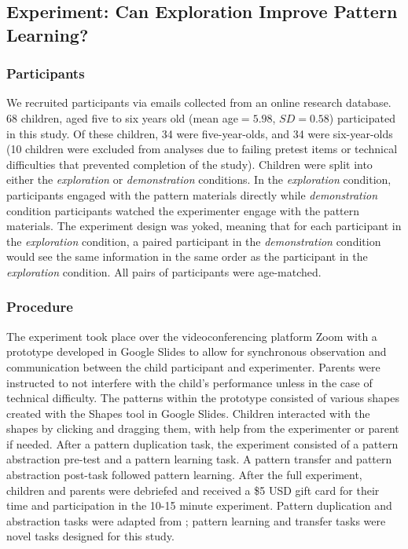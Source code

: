\subsection{Experiment: Can Exploration Improve Pattern Learning?}

\subsubsection{Participants}
We recruited participants via emails collected from an online research database. 68 children, aged five to six years old (mean age$=5.98$, $SD=0.58$) participated in this study. Of these children, 34 were five-year-olds, and 34 were six-year-olds (10 children were excluded from analyses due to failing pretest items or technical difficulties that prevented completion of the study). Children were split into either the \textit{exploration} or \textit{demonstration} conditions. In the \textit{exploration} condition, participants engaged with the pattern materials directly while \textit{demonstration} condition participants watched the experimenter engage with the pattern materials. The experiment design was yoked, meaning that for each participant in the \textit{exploration} condition, a paired participant in the \textit{demonstration} condition would see the same information in the same order as the participant in the \textit{exploration} condition. All pairs of participants were age-matched.

\subsubsection{Procedure}
The experiment took place over the videoconferencing platform Zoom with a prototype developed in Google Slides to allow for synchronous observation and communication between the child participant and experimenter. Parents were instructed to not interfere with the child's performance unless in the case of technical difficulty. The patterns within the prototype consisted of various shapes created with the Shapes tool in Google Slides. Children interacted with the shapes by clicking and dragging them, with help from the experimenter or parent if needed. After a pattern duplication task, the experiment consisted of a pattern abstraction pre-test and a pattern learning task. A pattern transfer and pattern abstraction post-task followed pattern learning. After the full experiment, children and parents were debriefed and received a \$5 USD gift card for their time and participation in the 10-15 minute experiment. Pattern duplication and abstraction tasks were adapted from \cite{rittle-johnson2007}; pattern learning and transfer tasks were novel tasks designed for this study.

